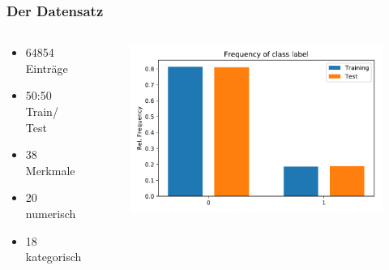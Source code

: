 \documentclass{beamer}
\begin{document}
\begin{frame}
\frametitle{Der Datensatz}
\begin{columns}[c] %

\begin{footnotesize}
\begin{itemize}
\item 64854 Einträge
\item 50:50 Train/ Test 
\item 38 Merkmale
\item 20 numerisch
\item 18 kategorisch
\end{itemize}
\end{footnotesize}

\begin{figure}
\begin{center}
\includegraphics[width=1.0\textwidth]{pdf/distTrainTest.pdf}
\end{center}
\end{figure}
\end{columns}
\end{frame}

\end{document}
